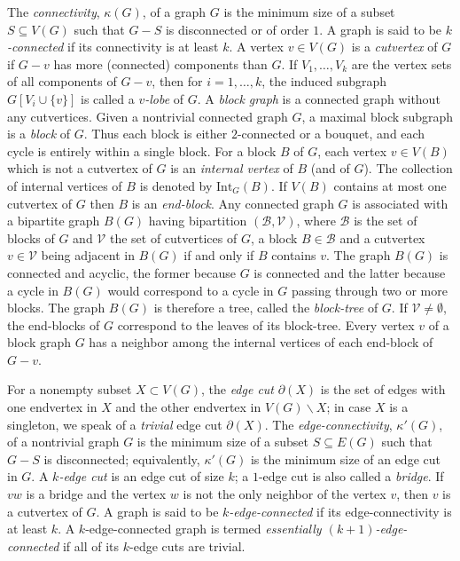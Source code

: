\documentclass[a4paper,12pt]{article}
\numberwithin{equation}{section}
\begin{document}
The \textit{connectivity}, $\kappa(G)$,  of a graph $G$ is the minimum size of a subset $S\subseteq V(G)$  such that $G-S$ is disconnected or of order $1$. A graph is said to be \textit{$k$-connected} if its connectivity is at least $k$.
A vertex $v\in V(G)$ is a \textit{cutvertex} of $G$ if $G-v$ has more (connected) components than $G$. If $V_1,\ldots,V_k$ are the vertex sets of all components of $G-v$, then for $i=1,\ldots,k$, the induced subgraph $G[V_i\cup \{v\}]$ is called a \textit{$v$-lobe} of $G$.
 A \textit{block graph} is a connected graph without any cutvertices. Given a nontrivial connected graph $G$, a maximal block subgraph is a \textit{block} of $G$. Thus each block is either $2$-connected or a bouquet, and each cycle is entirely within a single block. For a block $B$ of $G$, each vertex $v\in V(B)$ which is not a cutvertex of $G$ is an \textit{internal vertex} of $B$ (and of $G$). The collection of internal vertices of $B$ is denoted by $\mathrm{Int}_G(B)$.
 If $V(B)$ contains at most one cutvertex of $G$ then $B$ is an \textit{end-block}.
 Any connected graph $G$ is associated with a bipartite graph $B(G)$ having bipartition
$(\mathcal{B},\mathcal{V})$, where $\mathcal{B}$ is the set of blocks of $G$ and $\mathcal{V}$ the set of cutvertices of $G$, a
block $B\in \mathcal{B}$ and a cutvertex $v\in \mathcal{V}$ being adjacent in $B(G)$ if and only if $B$ contains
$v$. The graph $B(G)$ is connected and acyclic, the former because $G$ is connected and the latter because a cycle in $B(G)$ would correspond to
a cycle in $G$ passing through two or more blocks.
The graph $B(G)$ is therefore a tree, called the \textit{block-tree} of $G$.
If $\mathcal{V}\neq\emptyset$, the end-blocks of $G$ correspond to the leaves of its block-tree. Every vertex $v$ of a block graph $G$ has a neighbor among the internal vertices of each end-block of $G-v$.

For a nonempty subset $X\subset V(G)$, the \textit{edge cut} $\partial(X)$ is the set of edges with one endvertex in $X$ and the other endvertex in $V(G)\backslash X$; in case $X$ is a singleton, we speak of a \textit{trivial} edge cut $\partial(X)$. The \textit{edge-connectivity}, $\kappa'(G)$, of a nontrivial graph $G$ is the minimum size of a subset $S\subseteq E(G)$ such that $G-S$ is disconnected; equivalently, $\kappa'(G)$ is the minimum size of an edge cut in $G$.  A \textit{$k$-edge cut} is an edge cut of size $k$; a $1$-edge cut is also called a \textit{bridge}. If $vw$ is a bridge and the vertex $w$ is not the only neighbor of the vertex $v$, then $v$ is a cutvertex of $G$. A graph is said to be \textit{$k$-edge-connected} if its edge-connectivity is at least $k$.
A $k$-edge-connected
graph is termed \textit{essentially $(k+1)$-edge-connected} if all of its $k$-edge cuts
are trivial.
\end{document}
